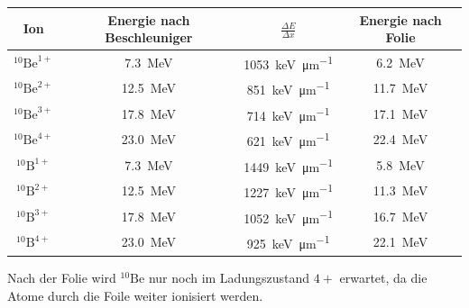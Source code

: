 \begin{center}
  \begin{tabular}{|c|c|c|c|}
    \hline
    Ion & Energie nach Beschleuniger & $\frac{\Delta E}{\Delta x}$ & Energie nach Folie \\
    \hline
    $^{10}\text{Be}^{1+}$ & \SI{7.3}{\mega\electronvolt}  & \SI{1053}{\kilo\electronvolt\per\micro\metre} & \SI{6.2}{\mega\electronvolt} \\
    $^{10}\text{Be}^{2+}$ & \SI{12.5}{\mega\electronvolt} & \SI{851}{\kilo\electronvolt\per\micro\metre} & \SI{11.7}{\mega\electronvolt} \\
    $^{10}\text{Be}^{3+}$ & \SI{17.8}{\mega\electronvolt} & \SI{714}{\kilo\electronvolt\per\micro\metre} & \SI{17.1}{\mega\electronvolt} \\
    $^{10}\text{Be}^{4+}$ & \SI{23.0}{\mega\electronvolt} & \SI{621}{\kilo\electronvolt\per\micro\metre} & \SI{22.4}{\mega\electronvolt} \\
    \hline
    $^{10}\text{B}^{1+}$ & \SI{7.3}{\mega\electronvolt}  & \SI{1449}{\kilo\electronvolt\per\micro\metre} & \SI{5.8}{\mega\electronvolt} \\
    $^{10}\text{B}^{2+}$ & \SI{12.5}{\mega\electronvolt} & \SI{1227}{\kilo\electronvolt\per\micro\metre} & \SI{11.3}{\mega\electronvolt} \\
    $^{10}\text{B}^{3+}$ & \SI{17.8}{\mega\electronvolt} & \SI{1052}{\kilo\electronvolt\per\micro\metre} & \SI{16.7}{\mega\electronvolt} \\
    $^{10}\text{B}^{4+}$ & \SI{23.0}{\mega\electronvolt} & \SI{925}{\kilo\electronvolt\per\micro\metre} & \SI{22.1}{\mega\electronvolt} \\
    \hline
  \end{tabular}
  \label{Auswertung_tab_Ionenenergien_nach_Folie}
\end{center}
Nach der Folie wird $^{10}\text{Be}$ nur noch im Ladungszustand $4+$ erwartet, da die Atome durch die Foile weiter ionisiert werden.

